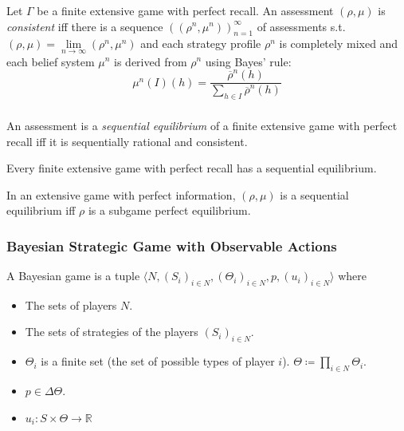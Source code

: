 \documentclass[UTF8,11pt,colorlinks,compress,openany]{beamer}%
\begin{document}
\begin{frame}\frametitle{}
\begin{definition}
	Let $\Gamma$ be a finite extensive game with perfect recall. An assessment $(\rho,\mu)$ is \emph{consistent} iff there is a sequence $((\rho^n,\mu^n))_{n=1}^\infty$ of assessments s.t. $(\rho,\mu)=\lim\limits_{n\to\infty}(\rho^n,\mu^n)$ and each strategy profile $\rho^n$ is completely mixed and each belief system $\mu^n$ is derived from $\rho^n$ using Bayes' rule: \[\mu^n(I)(h)=\dfrac{\overline{\rho}^n(h)}{\sum\limits_{h\in I}\overline{\rho}^n(h)}\]
\end{definition}
\end{frame}

\begin{frame}\frametitle{}
\begin{definition}
	An assessment is a \emph{sequential equilibrium} of a finite extensive game with perfect recall iff it is sequentially rational and consistent.
\end{definition}
\begin{theorem}
	Every finite extensive game with perfect recall has a sequential equilibrium.
\end{theorem}
\begin{theorem}
	In an extensive game with perfect information, $(\rho,\mu)$ is a sequential equilibrium iff $\rho$ is a subgame perfect equilibrium.
\end{theorem}
\end{frame}

\begin{frame}\frametitle{Bayesian Strategic Game with Observable Actions}
\begin{definition}
	A Bayesian game is a tuple $\langle N,(S_i)_{i\in N},(\Theta_i)_{i\in N},p,(u_i)_{i\in N}\rangle$ where
	\begin{itemize}
		\item The sets of players $N$.
		\item The sets of strategies of the players $(S_i)_{i\in N}$.
		\item $\Theta_i$ is a finite set (the set of possible types of player $i$). $\Theta\coloneqq \prod\limits_{i\in N}\Theta_i$.
		\item $p\in\Delta\Theta$.
		\item $u_i: S\times\Theta\to\mathbb R$
	\end{itemize}
\end{definition}
\end{frame}
\end{document}
